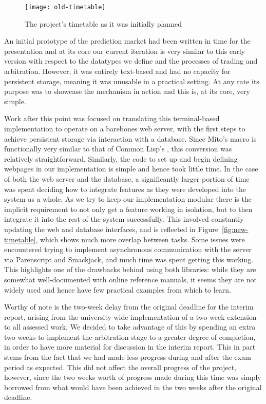 \begin{figure}[h]
	\centering
	\texttt{[image: old-timetable]}
	\caption{The project's timetable as it was initially planned}
	\label{fig:old-timetable}
\end{figure}

An initial prototype of the prediction market had been written in time for the
presentation and at its core our current iteration is very similar to this
early version with respect to the datatypes we define and the processes of
trading and arbitration. However, it was entirely text-based and had no
capacity for persistent storage, meaning it was unusable in a practical
setting. At any rate its purpose was to showcase the mechanism in action and
this is, at its core, very simple. 

Work after this point was focused on translating this terminal-based
implementation to operate on a barebones web server, with the first steps to
achieve persistent storage via interaction with a database. Since Mito's
 macro is functionally very similar to that of Common Lisp's
, this conversion was relatively straightforward. Similarly,
the code to set up and begin defining webpages in our implementation is simple
and hence took little time. In the case of both the web server and the
database, a significantly larger portion of time was spent deciding how to
integrate features as they were developed into the system as a whole. As we try
to keep our implementation modular there is the implicit requirement to not
only get a feature working in isolation, but to then integrate it into the rest
of the system successfully. This involved constantly updating the web and
database interfaces, and is reflected in Figure~\ref{fig:new-timetable}, which
shows much more overlap between tasks.  Some issues were encountered trying to
implement asynchronous communication with the server via Parenscript and
Smackjack, and much time was spent getting this working. This highlights one of
the drawbacks behind using both libraries: while they are somewhat
well-documented with online reference manuals, it seems they are not widely
used and hence have few practical examples from which to learn.

Worthy of note is the two-week delay from the original deadline for the interim
report, arising from the university-wide implementation of a two-week extension
to all assessed work. We decided to take advantage of this by spending an extra
two weeks to implement the arbitration stage to a greater degree of completion,
in order to have more material for discussion in the interim report. This in
part stems from the fact that we had made less progress during and after the
exam period as expected. This did not affect the overall progress of the
project, however, since the two weeks worth of progress made during this time
was simply borrowed from what would have been achieved in the two weeks after
the original deadline. 

